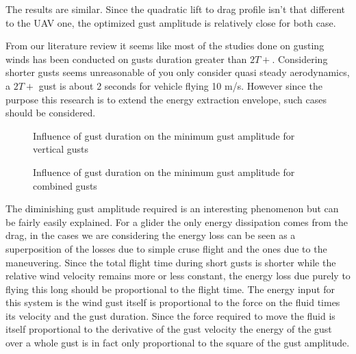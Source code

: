 \par The results are similar.
Since the quadratic lift to drag profile isn't that different to the UAV one, the optimized gust amplitude is relatively close for both case.

\FloatBarrier

%



From our literature review it seems like most of the studies done on gusting winds has been conducted on gusts duration greater than $2T+$.
Considering shorter gusts seems unreasonable of you only consider quasi steady aerodynamics, a $2T+$ gust is about 2 seconds for vehicle flying 10 m/s.
However since the purpose this research is to extend the energy extraction envelope, such cases should be considered.

\begin{figure}[h!]
  \begin{center}
  \end{center}
  \caption{Influence of gust duration on the minimum gust amplitude for vertical gusts}
  \label{fig:vertical_amplitude_duration}
\end{figure}

\begin{figure}[h!]
  \begin{center}
  \end{center}
  \caption{Influence of gust duration on the minimum gust amplitude for combined gusts}
  \label{fig:combined_amplitude_duration}
\end{figure}

\par The diminishing gust amplitude required is an interesting phenomenon but can be fairly easily explained.
For a glider the only energy dissipation comes from the drag, in the cases we are considering the energy loss can be seen as a superposition of the losses due to simple cruse flight and the ones due to the maneuvering.
Since the total flight time during short gusts is shorter while the relative wind velocity remains more or less constant, the energy loss due purely to flying this long should be proportional to the flight time.
The energy input for this system is the wind gust itself is proportional to the force on the fluid times its velocity and the gust duration.
Since the force required to move the fluid is itself proportional to the derivative of the gust velocity the energy of the gust over a whole gust is in fact only proportional to the square of the gust amplitude.

